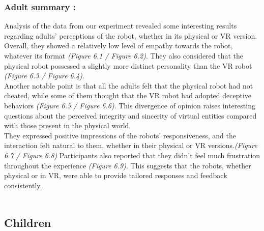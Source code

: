     \subsubsection{Adult summary :}
Analysis of the data from our experiment revealed some interesting results regarding adults' perceptions of the robot, whether in its physical or VR version. Overall, they showed a relatively low level of empathy towards the robot, whatever its format \textit{(Figure 6.1 / Figure 6.2)}. They also considered that the physical robot possessed a slightly more distinct personality than the VR robot \textit{(Figure 6.3 / Figure 6.4)}.\\
Another notable point is that all the adults felt that the physical robot had not cheated, while some of them thought that the VR robot had adopted deceptive behaviors \textit{(Figure 6.5 / Figure 6.6)}. This divergence of opinion raises interesting questions about the perceived integrity and sincerity of virtual entities compared with those present in the physical world.\\
 They expressed positive impressions of the robots' responsiveness, and the interaction felt natural to them, whether in their physical or VR versions.\textit{(Figure 6.7 / Figure 6.8)} Participants also reported that they didn't feel much frustration throughout the experience \textit{(Figure 6.9)}. This suggests that the robots, whether physical or in VR, were able to provide tailored responses and feedback consistently.\\
\\

    \newpage
\subsection{Children}


